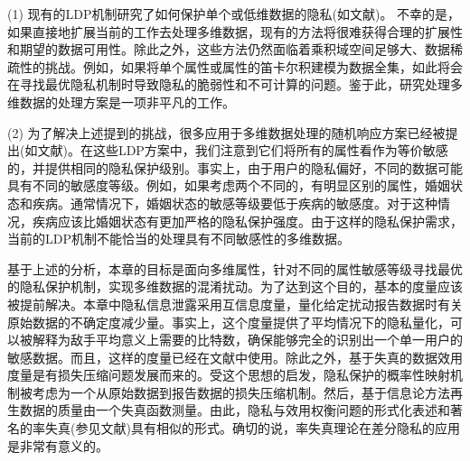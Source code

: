 (1) 现有的LDP机制研究了如何保护单个或低维数据的隐私(如文献)。 不幸的是，如果直接地扩展当前的工作去处理多维数据，现有的方法将很难获得合理的扩展性和期望的数据可用性。除此之外，这些方法仍然面临着乘积域空间足够大、数据稀疏性的挑战。例如，如果将单个属性或属性的笛卡尔积建模为数据全集，如此将会在寻找最优隐私机制时导致隐私的脆弱性和不可计算的问题。鉴于此，研究处理多维数据的处理方案是一项非平凡的工作。

(2) 为了解决上述提到的挑战，很多应用于多维数据处理的随机响应方案已经被提出(如文献)。在这些LDP方案中，我们注意到它们将所有的属性看作为等价敏感的，并提供相同的隐私保护级别。事实上，由于用户的隐私偏好，不同的数据可能具有不同的敏感度等级\cite{murakami2019utility,gu2020providing}。例如，如果考虑两个不同的，有明显区别的属性，婚姻状态和疾病。通常情况下，婚姻状态的敏感等级要低于疾病的敏感度。对于这种情况，疾病应该比婚姻状态有更加严格的隐私保护强度。由于这样的隐私保护需求，当前的LDP机制不能恰当的处理具有不同敏感性的多维数据。

%

基于上述的分析，本章的目标是面向多维属性，针对不同的属性敏感等级寻找最优的隐私保护机制，实现多维数据的混淆扰动。为了达到这个目的，基本的度量应该被提前解决。本章中隐私信息泄露采用互信息度量，量化给定扰动报告数据时有关原始数据的不确定度减少量。事实上，这个度量提供了平均情况下的隐私量化，可以被解释为敌手平均意义上需要的比特数，确保能够完全的识别出一个单一用户的敏感数据\cite{oya2017back}。而且，这样的度量已经在文献中使用。除此之外，基于失真的数据效用度量是有损失压缩问题\cite{sarwate2014a}发展而来的。受这个思想的启发，隐私保护的概率性映射机制被考虑为一个从原始数据到报告数据的损失压缩机制。然后，基于信息论方法再生数据的质量由一个失真函数测量。由此，隐私与效用权衡问题的形式化表述和著名的率失真(参见文献)具有相似的形式。确切的说，率失真理论在差分隐私的应用是非常有意义的。

